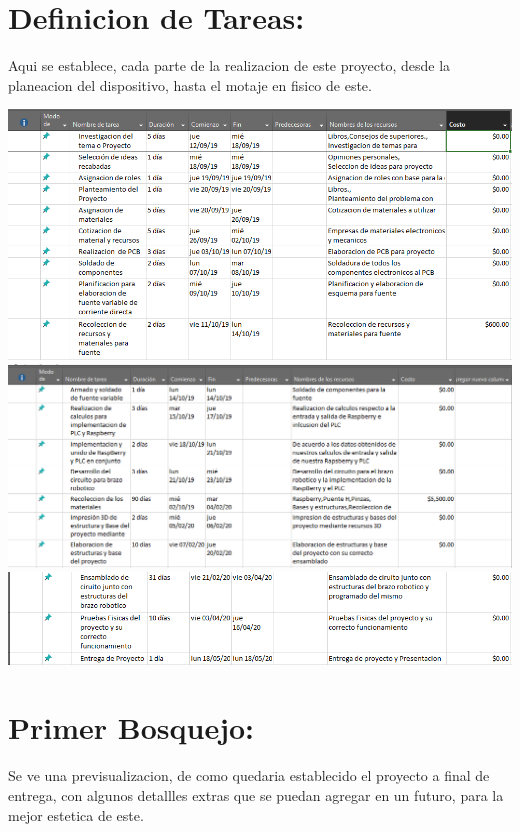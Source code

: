 \documentclass[14pt,a4paper]{article}
\begin{document}
\section{Definicion de Tareas:}
Aqui se establece, cada parte de la realizacion de este proyecto, desde la planeacion del dispositivo, hasta el motaje en fisico de este.

\begin{center}
 \includegraphics[width=15cm]{DefinicionTareas/4.png}\\
 
 \includegraphics[width=15cm]{DefinicionTareas/5.png}\\
 
 \includegraphics[width=15cm]{DefinicionTareas/6.png} 
\end{center}
\newpage
\section{Primer Bosquejo:}
Se ve una previsualizacion, de como quedaria establecido el proyecto a final de entrega, con algunos detallles extras que se puedan agregar en un futuro, para la mejor estetica de este.
\end{document}

